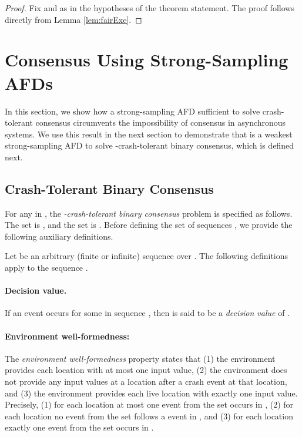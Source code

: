 \documentclass[11pt]{article}
\numberwithin{theorem}{section}
\begin{document}
\begin{proof}
 Fix  and  as in the hypotheses of the theorem statement. The proof follows directly from Lemma \ref{lem:fairExe}.
\end{proof}




\section{Consensus Using Strong-Sampling AFDs}
\label{sec:consensusAndAFD}



In this section, we show how a strong-sampling AFD sufficient to solve 
crash-tolerant  consensus circumvents the impossibility of consensus
in asynchronous systems. We use this result in the next section to
demonstrate that  is a weakest strong-sampling AFD to
solve -crash-tolerant binary consensus, which is defined next.



\subsection{Crash-Tolerant Binary Consensus}
\label{subsec:consensusDef} 

For any   in , the \emph{-crash-tolerant binary consensus} problem  is specified as follows. The set  is , and the set  is . Before defining the set of sequences , we provide the following auxiliary definitions. 

Let  be an arbitrary (finite or infinite) sequence over . The following definitions apply to the sequence . 

\paragraph{Decision value.} If an event  occurs for some  in sequence , then  is said to be a \emph{decision value} of . 


\paragraph{Environment well-formedness:} 
The \emph{environment well-formedness} property states that (1) the environment provides each location with 
at most one input value, (2) the environment does not provide any input values at a location after a crash event at that location, and (3) the environment provides each live location with exactly one input value. 
Precisely, (1) for each location 
at most one event from the set  occurs in , (2) for each location  no event from the set  follows a  event in , and (3) for each location  exactly one event from the set  occurs in .
\end{document}
